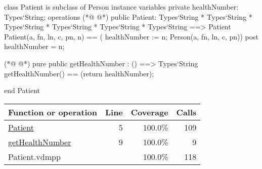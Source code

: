 \begin{vdmpp}[breaklines=true]
class Patient is subclass of Person
instance variables
  private healthNumber: Types`String;
operations
(*@
\label{Patient:5}
@*)
 public Patient: Types`String * Types`String * Types`String * Types`String * Types`String * Types`String ==> Patient
  Patient(a, fn, ln, c, pn, n) == ( healthNumber := n; Person(a, fn, ln, c, pn))
 post healthNumber = n;
 
(*@
\label{getHealthNumber:9}
@*)
 pure public getHealthNumber : () ==> Types`String
  getHealthNumber() == (return healthNumber);

end Patient
\end{vdmpp}
\bigskip
\begin{longtable}{|l|r|r|r|}
\hline
Function or operation & Line & Coverage & Calls \\
\hline
\hline
\hyperref[Patient:5]{Patient} & 5&100.0\% & 109 \\
\hline
\hyperref[getHealthNumber:9]{getHealthNumber} & 9&100.0\% & 9 \\
\hline
\hline
Patient.vdmpp & & 100.0\% & 118 \\
\hline
\end{longtable}

